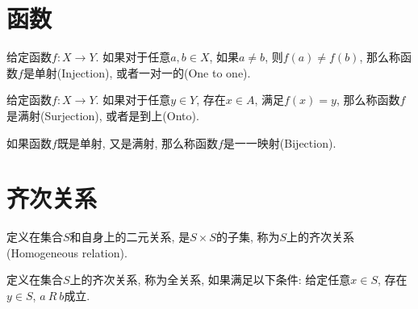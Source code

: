 \section{函数}
\begin{definition}[单射]
	给定函数$f\colon X\rightarrow Y$. 如果对于任意$a,b\in X$, 如果$a\neq b$, 则$f(a)\neq f(b)$, 那么称函数$f$是单射(Injection), 或者一对一的(One to one).
\end{definition}

\begin{definition}[满射]
	给定函数$f\colon X\rightarrow Y$. 如果对于任意$y\in Y$, 存在$x\in A$, 满足$f(x)=y$, 那么称函数$f$是满射(Surjection), 或者是到上(Onto).
\end{definition}

\begin{definition}[一一映射]
	如果函数$f$既是单射, 又是满射, 那么称函数$f$是一一映射(Bijection).
\end{definition}

\section{齐次关系}
\begin{definition}[齐次关系]
	定义在集合$S$和自身上的二元关系, 是$S\times S$的子集, 称为$S$上的齐次关系(Homogeneous relation).
\end{definition}

\begin{definition}[全关系]
	定义在集合$S$上的齐次关系, 称为全关系, 如果满足以下条件: 给定任意$x\in S$, 存在$y\in S$, $a\ R\ b$成立.
\end{definition}

